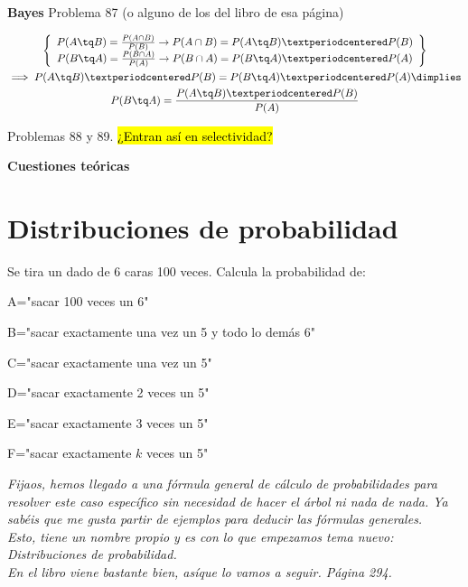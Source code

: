 \textbf{Bayes}
Problema 87 (o alguno de los del libro de esa página)

\begin{theorem}[Bayes]
\begin{gather*}
\left\{
\begin{array}{c}
	P(A\tq B) = \frac{P(A\cap B)}{P(B)} \to P(A\cap B) = P(A\tq B)· P(B)\\
	P(B\tq A) = \frac{P(B\cap A)}{P(A)} \to P(B\cap A) = P(B\tq A)· P(A)
\end{array} \right\} 
\\
\implies P(A\tq B)· P(B) = P(B\tq A)· P(A) \dimplies 
\\
P(B\tq A) = \frac{P(A\tq B)· P(B)}{P(A)}
\end{gather*}
\end{theorem}

Problemas 88 y 89. \hl{¿Entran así en selectividad?}


\textbf{Cuestiones teóricas}


\section{Distribuciones de probabilidad}

\begin{problem}
Se tira un dado de 6 caras 100 veces. Calcula la probabilidad de:

\ppart A="sacar 100 veces un 6"

\ppart B="sacar exactamente una vez un 5 y todo lo demás 6"

\ppart C="sacar exactamente una vez un 5"

\ppart D="sacar exactamente 2 veces un 5"

\ppart E="sacar exactamente 3 veces un 5"

\ppart F="sacar exactamente $k$ veces un 5"

\solution

\end{problem}

\textit{Fijaos, hemos llegado a una fórmula general de cálculo de probabilidades para resolver este caso específico sin necesidad de hacer el árbol ni nada de nada. Ya sabéis que me gusta partir de ejemplos para deducir las fórmulas generales.
\\
Esto, tiene un nombre propio y es con lo que empezamos tema nuevo: Distribuciones de probabilidad.
\\
En el libro viene bastante bien, asíque lo vamos a seguir. Página 294.
}

